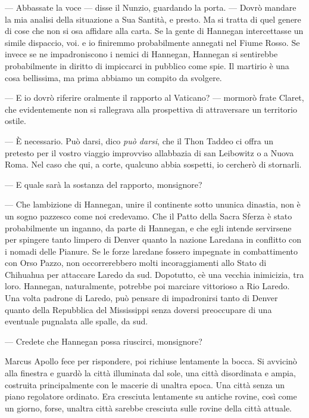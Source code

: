 	--- Abbassate la voce --- disse il Nunzio, guardando la porta. --- Dovrò
	mandare la mia analisi della situazione a Sua Santità, e presto. Ma si
	tratta di quel genere di cose che non si osa affidare alla carta. Se la
	gente di Hannegan intercettasse un simile dispaccio, voi. e io finiremmo
	probabilmente annegati nel Fiume Rosso. Se invece se ne impadroniscono i
	nemici di Hannegan, Hannegan si sentirebbe probabilmente in diritto di
	impiccarci in pubblico come spie. Il martirio è una cosa bellissima, ma
	prima abbiamo un compito da svolgere.
	
	--- E io dovrò riferire oralmente il rapporto al Vaticano? --- mormorò
	frate Claret, che evidentemente non si rallegrava alla prospettiva di
	attraversare un territorio ostile.
	
	--- È necessario. Può darsi, dico \emph{può darsi}, che il Thon Taddeo
	ci offra un pretesto per il vostro viaggio improvviso
	all\textquotesingle abbazia di san Leibowitz o a Nuova Roma. Nel caso
	che qui, a corte, qualcuno abbia sospetti, io cercherò di stornarli.
	
	--- E quale sarà la sostanza del rapporto, monsignore?
	
	--- Che l\textquotesingle ambizione di Hannegan, unire il continente
	sotto un\textquotesingle unica dinastia, non è un sogno pazzesco come
	noi credevamo. Che il Patto della Sacra Sferza è stato probabilmente un
	inganno, da parte di Hannegan, e che egli intende servirsene per
	spingere tanto l\textquotesingle impero di Denver quanto la nazione
	Laredana in conflitto con i nomadi delle Pianure. Se le forze laredane
	fossero impegnate in combattimento con Orso Pazzo, non occorrerebbero
	molti incoraggiamenti allo Stato di Chihuahua per attaccare Laredo da
	sud. Dopotutto, c\textquotesingle è una vecchia inimicizia, tra loro.
	Hannegan, naturalmente, potrebbe poi marciare vittorioso a Rio Laredo.
	Una volta padrone di Laredo, può pensare di impadronirsi tanto di Denver
	quanto della Repubblica del Mississippi senza doversi preoccupare di una
	eventuale pugnalata alle spalle, da sud.
	
	--- Credete che Hannegan possa riuscirci, monsignore?
	
	Marcus Apollo fece per rispondere, poi richiuse lentamente la bocca. Si
	avvicinò alla finestra e guardò la città illuminata dal sole, una città
	disordinata e ampia, costruita principalmente con le macerie di
	un\textquotesingle altra epoca. Una città senza un piano regolatore
	ordinato. Era cresciuta lentamente su antiche rovine, così come un
	giorno, forse, un\textquotesingle altra città sarebbe cresciuta sulle
	rovine della città attuale.
	
